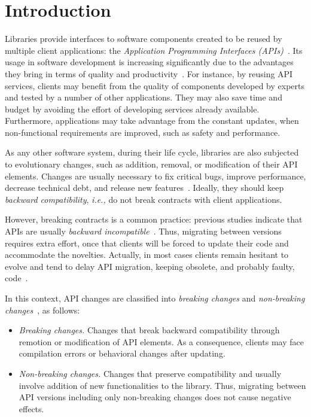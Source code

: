 \documentclass[11pt, a4paper]{article}
\newcommand{\ie}{\emph{i.e.,}\xspace}
\begin{document}


\section{Introduction} 

Libraries provide interfaces to software components created to be reused by multiple client applications: the \emph{Application Programming Interfaces (APIs)}~\citep{reddy2011api,apiDef}.
Its usage in software development is increasing significantly due to the advantages they bring in terms of quality and productivity~\citep{Kons09,Mose96}.
For instance, by reusing API services, clients may benefit from the quality of components developed by experts and tested by a number of other applications.
They may also save time and budget by avoiding the effort of developing services already available.
Furthermore, applications may take advantage from the constant updates, when non-functional requirements are improved, such as safety and performance.

As any other software system, during their life cycle, libraries are also subjected to evolutionary changes, such as addition, removal, or modification of their API elements.
Changes are usually necessary to fix critical bugs, improve performance, decrease technical debt, and release new features~\citep{thung16}.
Ideally, they should keep \emph{backward compatibility}, \ie do not break contracts with client applications.

However, breaking contracts is a common practice: previous studies indicate that APIs are usually \emph{backward incompatible}~\citep{Wu10,Robb12,Hora15a,Brito16}.
Thus, migrating between versions requires extra effort, once that clients will be forced to update their code and accommodate the novelties.
Actually, in most cases clients remain hesitant to evolve and tend to delay API migration, keeping obsolete, and probably faulty, code~\citep{McDo13}.

In this context, API changes are classified into \textit{breaking changes} and \textit{non-breaking changes}~\citep{dig}, as follows:  

\begin{itemize} 
	\item \emph{Breaking changes.} Changes that break backward compatibility through remotion or modification of API elements. 
	As a consequence, clients may face compilation errors or behavioral changes after updating. 
	
	\item \emph{Non-breaking changes.} Changes that preserve compatibility and usually involve addition of new functionalities to the library. 
	Thus, migrating between API versions including only non-breaking changes does not cause negative effects. 
\end{itemize} 
\end{document}
